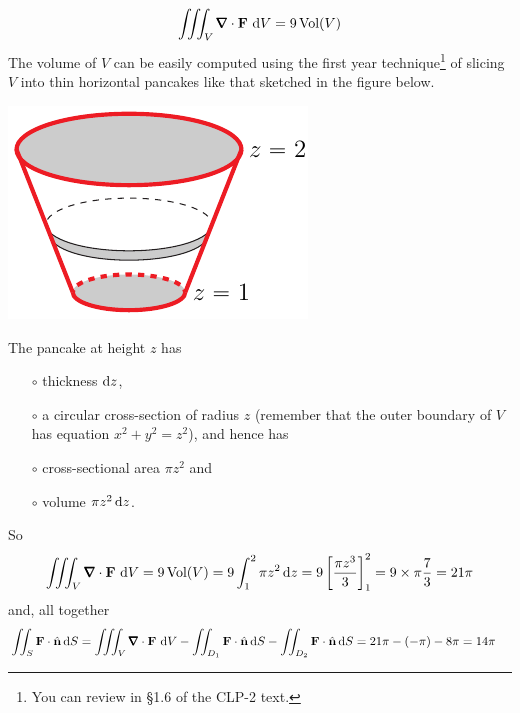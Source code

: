 \begin{eg}
\begin{align*}
\tripInt_V\vnabla\cdot\vF\ \dee{V}
=9\,\text{Vol}(V)
\end{align*}
The volume of $V$ can be easily computed using the first year 
technique\footnote{You can review in \S1.6 of the CLP-2 text.}
of slicing $V$ into thin horizontal pancakes like that sketched in the 
figure below.
\begin{nfig}
\begin{center}
    \includegraphics{coneC.pdf}
\end{center}
\end{nfig}
The pancake at height $z$ has 
\begin{itemize}\itemsep1pt \parskip0pt  %
\item[$\circ$] 
thickness $\mathrm{d}z$,
\item[$\circ$] 
a circular cross-section of radius $z$ (remember that the outer
boundary of $V$ has equation $x^2+y^2=z^2$), and hence has
\item[$\circ$] 
cross-sectional area $\pi z^2$ and
\item[$\circ$] 
volume $\pi z^2\,\mathrm{d}z$.
\end{itemize}
So
\begin{align*}
\tripInt_V\vnabla\cdot\vF\ \dee{V}
=9\,\text{Vol}(V)
=9\int_1^2 \pi z^2\,\dee{z}
=9\left[\frac{\pi z^3}{3}\right]_1^2
=9\times \pi\frac{7}{3}
=21\pi
\end{align*}
and, all together
\begin{align*}
\dblInt_S \vF\cdot\hn\,\dee{S}
&= \tripInt_V\vnabla\cdot\vF\ \dee{V} 
  -\dblInt_{D_1} \vF\cdot\hn\,\dee{S}
 -\dblInt_{D_2} \vF\cdot\hn\,\dee{S}
= 21\pi - (-\pi) -8\pi
=14\pi
\end{align*}



\end{eg}

